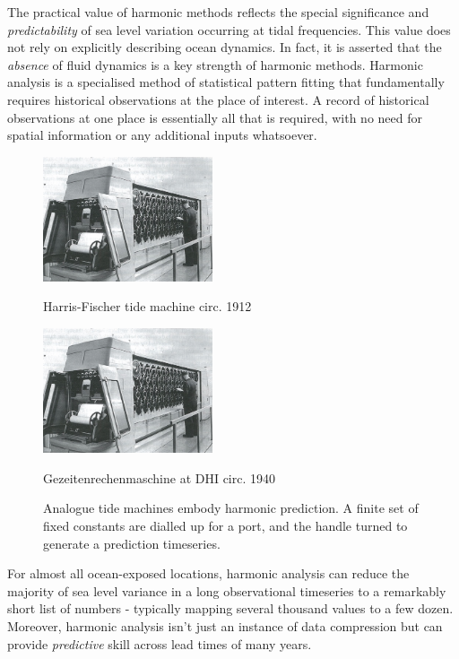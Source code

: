 The practical value of harmonic methods reflects the special significance and \emph{predictability} of sea level variation occurring at tidal frequencies.  This value does not rely on explicitly describing ocean dynamics.  In fact, it is asserted that the \emph{absence} of fluid dynamics is a key strength of harmonic methods.   Harmonic analysis is a specialised method of statistical pattern fitting that fundamentally requires historical observations at the place of interest.   A record of historical observations at one place is essentially all that is required, with no need for spatial information or any additional inputs whatsoever. 



\begin{figure}[!h]
	\centering
	\includegraphics[width=50mm]{figures/DHI_machine_cartwright_fig11p2.png}
	\caption{Harris-Fischer tide machine circ. 1912 }
	\qquad
    \includegraphics[width=50mm]{figures/DHI_machine_cartwright_fig11p2.png}
	\caption{Gezeitenrechenmaschine at DHI circ. 1940 }
	\caption{Analogue tide machines embody harmonic prediction.  A finite set of fixed constants are dialled up for a port, and the handle turned to generate a prediction timeseries.}
	\label{fig:tide_machines}
\end{figure}


For almost all ocean-exposed locations, harmonic analysis can reduce the majority of sea level variance in a long observational timeseries to a remarkably short list of numbers - typically mapping several thousand values to a few dozen\citep{Flinchem:2000kp}.  Moreover, harmonic analysis isn't just an instance of data compression but can provide \emph{predictive} skill across lead times of many years.\\



